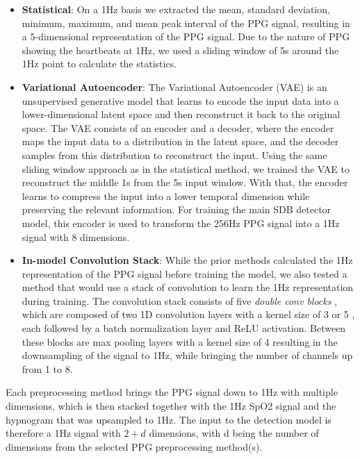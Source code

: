 \begin{itemize}
    \item \textbf{Statistical}: On a 1Hz basis we extracted the mean, standard deviation, minimum, maximum, and mean peak interval of the PPG signal, resulting in a 5-dimensional representation of the PPG signal. Due to the nature of PPG showing the heartbeats at 1Hz, we used a sliding window of 5s around the 1Hz point to calculate the statistics.
    \item \textbf{Variational Autoencoder}: The Variational Autoencoder (VAE) is an unsupervised generative model that learns to encode the input data into a lower-dimensional latent space and then reconstruct it back to the original space. The VAE consists of an encoder and a decoder, where the encoder maps the input data to a distribution in the latent space, and the decoder samples from this distribution to reconstruct the input. Using the same sliding window approach as in the statistical method, we trained the VAE to reconstruct the middle 1s from the 5s input window. With that, the encoder learns to compress the input into a lower temporal dimension while preserving the relevant information. For training the main SDB detector model, this encoder is used to transform the 256Hz PPG signal into a 1Hz signal with 8 dimensions.
    \item \textbf{In-model Convolution Stack}: While the prior methods calculated the 1Hz representation of the PPG signal before training the model, we also tested a method that would use a stack of convolution to learn the 1Hz representation during training. The convolution stack consists of five \textit{double conv blocks} , which are composed of two 1D convolution layers with a kernel size of 3 or 5 , each followed by a batch normalization layer and ReLU activation. Between these blocks are max pooling layers with a kernel size of 4 resulting in the downsampling of the signal to 1Hz, while bringing the number of channels up from 1 to 8.
\end{itemize}

Each preprocessing method brings the PPG signal down to 1Hz with multiple dimensions, which is then stacked together with the 1Hz SpO2 signal and the hypnogram that was upsampled to 1Hz. The input to the detection model is therefore a 1Hz signal with $2+d$ dimensions, with d being the number of dimensions from the selected PPG preprocessing method(s). 

